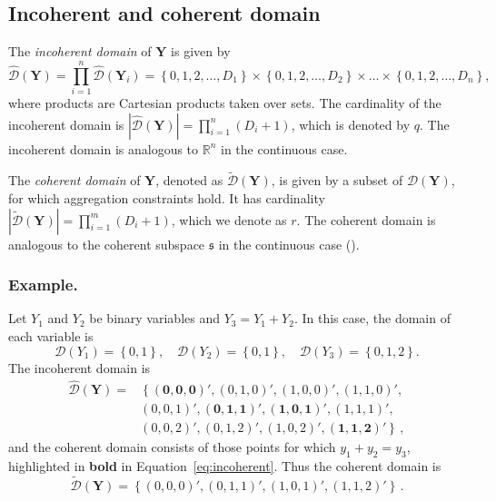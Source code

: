 \documentclass[a4paper,review,12pt,authoryear]{elsarticle}
\newcommand{\bY}{\mathbf{Y}}
\begin{document}
\subsection{Incoherent and coherent domain}\label{sec:domains}
The \textit{incoherent domain} of $\bY$ is given by
\[
\hat{\mathcal D}(\bY)=\prod\limits_{i=1}^n\hat{\mathcal D}(\bY_i)=\left\{0, 1,2,\dots,D_1\right\}\times\left\{0,1,2,\dots,D_2\right\}\times\dots\times\left\{0,1,2,\dots,D_n\right\},
\] 
where products are Cartesian products taken over sets. 
The cardinality of the incoherent domain is $|\hat{\mathcal D}(\bY)|=\prod\limits_{i=1}^{n} (D_i+1)$, which is denoted by $q$. 
The incoherent domain is analogous to $\mathbb{R}^n$ in the continuous case.
  
The \textit{coherent domain} of $\bY$, denoted as $\tilde{\mathcal D}(\bY)$, is given by a subset of $\hat{\mathcal D}(\bY)$, for which aggregation constraints hold.  
It has cardinality $|\tilde{\mathcal D}(\bY)|=\prod\limits_{i=1}^{m} (D_i+1)$, which we denote as $r$. 
The coherent domain is analogous to the coherent subspace $\mathfrak{s}$ in the continuous case (\citealp{panagiotelisProbabilisticForecastReconciliation2022}).
  
  \subsubsection*{\textbf{Example}.}
  \label{sec:example}
  
  Let $Y_1$ and $Y_2$ be binary variables and $Y_3=Y_1+Y_2$. In this case, the domain of each variable is
  \[
    \mathcal{D}(Y_1)=\left\{0,1\right\},\quad
    \mathcal{D}(Y_2)=\left\{0,1\right\},\quad
    \mathcal{D}(Y_3)=\left\{0,1,2\right\}.
  \]   
  The incoherent domain is
  \begin{equation}
  \begin{aligned}
  \hat{\mathcal D}(\bY)=&\left\{\mathbf{(0,0,0)'},(0,1,0)',(1,0,0)',(1,1,0)',\right.\\
  &\left.(0,0,1)',\mathbf{(0,1,1)'},\mathbf{(1,0,1)'},(1,1,1)',\right.\\
  &\left.(0,0,2)',(0,1,2)',(1,0,2)',\mathbf{(1,1,2)'}\right\}\,,  
  \end{aligned}
  \label{eq:incoherent}
  \end{equation}
  and the coherent domain consists of those points for which $y_1+y_2=y_3$, highlighted in \textbf{bold} in Equation~\eqref{eq:incoherent}. Thus the coherent domain is
  \[
      \tilde{\mathcal D}(\bY)=\left\{(0,0,0)',(0,1,1)',(1,0,1)',(1,1,2)'\right\}\,.
  \]
    
\end{document}
